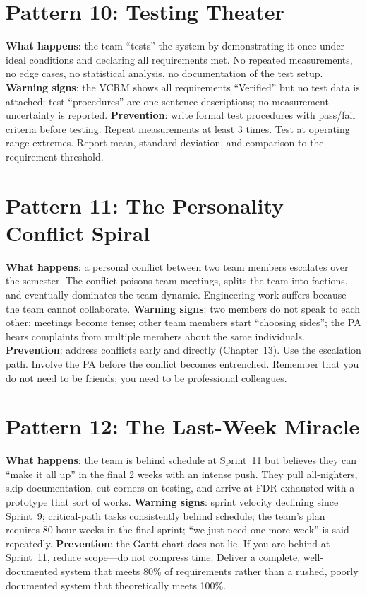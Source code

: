 \section*{Pattern 10: Testing Theater}
\textbf{What happens}: the team ``tests'' the system by demonstrating it once under ideal conditions and declaring all requirements met. No repeated measurements, no edge cases, no statistical analysis, no documentation of the test setup.
\textbf{Warning signs}: the VCRM shows all requirements ``Verified'' but no test data is attached; test ``procedures'' are one-sentence descriptions; no measurement uncertainty is reported.
\textbf{Prevention}: write formal test procedures with pass/fail criteria before testing. Repeat measurements at least 3 times. Test at operating range extremes. Report mean, standard deviation, and comparison to the requirement threshold.

\section*{Pattern 11: The Personality Conflict Spiral}
\textbf{What happens}: a personal conflict between two team members escalates over the semester. The conflict poisons team meetings, splits the team into factions, and eventually dominates the team dynamic. Engineering work suffers because the team cannot collaborate.
\textbf{Warning signs}: two members do not speak to each other; meetings become tense; other team members start ``choosing sides''; the PA hears complaints from multiple members about the same individuals.
\textbf{Prevention}: address conflicts early and directly (Chapter~13). Use the escalation path. Involve the PA before the conflict becomes entrenched. Remember that you do not need to be friends; you need to be professional colleagues.

\section*{Pattern 12: The Last-Week Miracle}
\textbf{What happens}: the team is behind schedule at Sprint~11 but believes they can ``make it all up'' in the final 2 weeks with an intense push. They pull all-nighters, skip documentation, cut corners on testing, and arrive at FDR exhausted with a prototype that sort of works.
\textbf{Warning signs}: sprint velocity declining since Sprint~9; critical-path tasks consistently behind schedule; the team's plan requires 80-hour weeks in the final sprint; ``we just need one more week'' is said repeatedly.
\textbf{Prevention}: the Gantt chart does not lie. If you are behind at Sprint~11, reduce scope---do not compress time. Deliver a complete, well-documented system that meets 80\% of requirements rather than a rushed, poorly documented system that theoretically meets 100\%.




